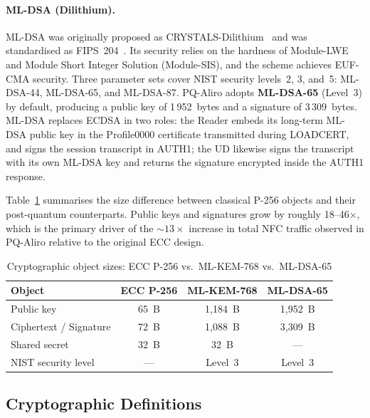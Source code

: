 \documentclass[runningheads]{llncs}
\begin{document}
\paragraph{ML-DSA (Dilithium).}
{\sloppy
ML-DSA was originally proposed as CRYSTALS-\allowbreak Dilithium~\cite{TCHES:DKLLSSS18}
and was standardised as FIPS~204~\cite{NIST:FIPS204}.  Its security relies on
the hardness of Module-LWE and Module Short Integer Solution (Module-SIS), and
the scheme achieves EUF-CMA security.  Three parameter sets cover NIST security
levels~2, 3, and~5: ML-DSA-44, ML-DSA-65, and ML-DSA-87.
PQ-Aliro adopts \textbf{ML-DSA-65} (Level~3) by default, producing a public
key of 1\,952~bytes and a signature of 3\,309~bytes.  ML-DSA replaces ECDSA in
two roles: the Reader embeds its long-term ML-DSA public key in the Profile0000
certificate transmitted during LOADCERT, and signs the session transcript in
AUTH1; the UD likewise signs the transcript with its own ML-DSA key and returns
the signature encrypted inside the AUTH1 response.
\par}

Table~\ref{tab:sizes} summarises the size difference between classical P-256
objects and their post-quantum counterparts.  Public keys and signatures grow
by roughly 18--46$\times$, which is the primary driver of the $\sim\!13\times$
increase in total NFC traffic observed in PQ-Aliro relative to the original
ECC design.

\begin{table}[t]
\caption{Cryptographic object sizes: ECC P-256 vs.\ ML-KEM-768 vs.\ ML-DSA-65}
\centering
\begin{tabular}{lccc}
\hline
Object & ECC P-256 & ML-KEM-768 & ML-DSA-65 \\
\hline
Public key         & 65~B    & 1{,}184~B & 1{,}952~B \\
Ciphertext / Signature & 72~B & 1{,}088~B & 3{,}309~B \\
Shared secret      & 32~B    & 32~B      & ---       \\
NIST security level & ---    & Level~3   & Level~3   \\
\hline
\end{tabular}
\label{tab:sizes}
\end{table}


\subsection{Cryptographic Definitions}
\label{sec:definitions}
\end{document}
